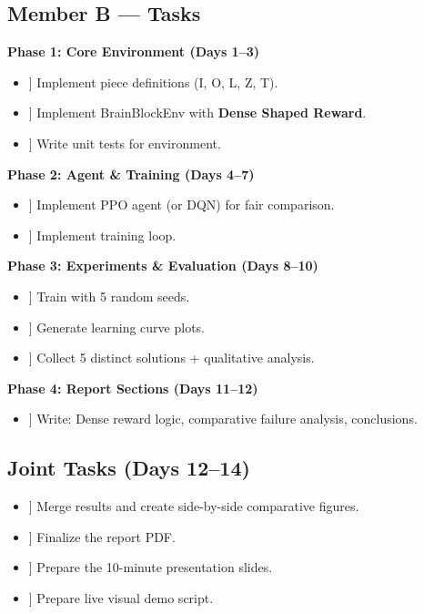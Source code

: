 \documentclass[11pt,a4paper]{article}
\begin{document}
\subsection{Member B — Tasks}
\textbf{Phase 1: Core Environment (Days 1--3)}
\begin{itemize}
    \item[ [ ] ] Implement piece definitions (I, O, L, Z, T).
    \item[ [ ] ] Implement BrainBlockEnv with \textbf{Dense Shaped Reward}.
    \item[ [ ] ] Write unit tests for environment.
\end{itemize}
\textbf{Phase 2: Agent \& Training (Days 4--7)}
\begin{itemize}
    \item[ [ ] ] Implement PPO agent (or DQN) for fair comparison.
    \item[ [ ] ] Implement training loop.
\end{itemize}
\textbf{Phase 3: Experiments \& Evaluation (Days 8--10)}
\begin{itemize}
    \item[ [ ] ] Train with 5 random seeds.
    \item[ [ ] ] Generate learning curve plots.
    \item[ [ ] ] Collect 5 distinct solutions + qualitative analysis.
\end{itemize}
\textbf{Phase 4: Report Sections (Days 11--12)}
\begin{itemize}
    \item[ [ ] ] Write: Dense reward logic, comparative failure analysis, conclusions.
\end{itemize}

\subsection{Joint Tasks (Days 12--14)}
\begin{itemize}
    \item[ [ ] ] Merge results and create side-by-side comparative figures.
    \item[ [ ] ] Finalize the report PDF.
    \item[ [ ] ] Prepare the 10-minute presentation slides.
    \item[ [ ] ] Prepare live visual demo script.
\end{itemize}
\end{document}
